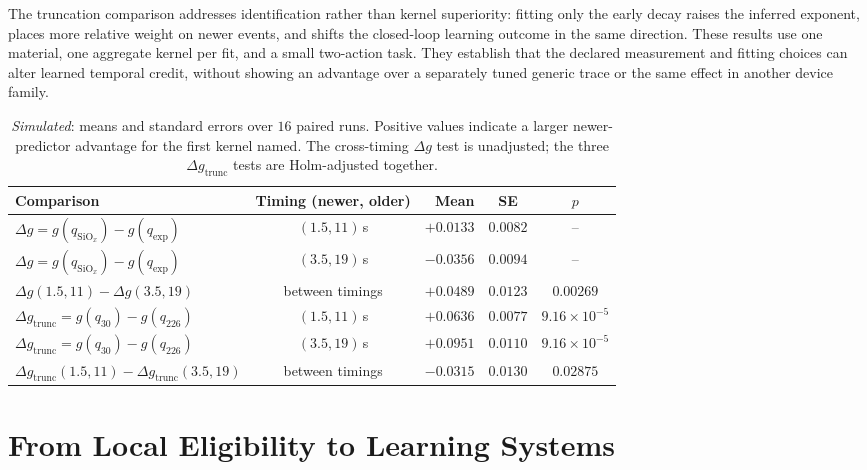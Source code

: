 \noindent The truncation comparison addresses identification rather than kernel superiority: fitting only the early
decay raises the inferred exponent, places more relative weight on newer events, and shifts the closed-loop learning
outcome in the same direction. These results use one material, one aggregate kernel per fit, and a small two-action
task. They establish that the declared measurement and fitting choices can alter learned temporal credit, without
showing an advantage over a separately tuned generic trace or the same effect in another device family.

\begin{table}[H]
    \caption[Learned-credit contrasts at the two evaluation timings.]{\emph{Simulated}: means and standard errors over
    $16$ paired runs. Positive values indicate a larger newer-predictor advantage for the first kernel named. The
    cross-timing $\Delta g$ test is unadjusted; the three $\Delta g_{\mathrm{trunc}}$ tests are Holm-adjusted together.}
    \begin{center}
    \footnotesize
    \setlength{\tabcolsep}{4pt}
    \begin{tabularx}{\textwidth}{@{}>{\raggedright\arraybackslash}X c r c c@{}}
    \toprule
    Comparison & Timing (newer, older) & Mean & SE & $p$ \\
    \midrule
    $\Delta g=g(q_{\mathrm{SiO}_x})-g(q_{\exp})$ & $(1.5,11)$\,s & $+0.0133$ & $0.0082$ & -- \\
    $\Delta g=g(q_{\mathrm{SiO}_x})-g(q_{\exp})$ & $(3.5,19)$\,s & $-0.0356$ & $0.0094$ & -- \\
    $\Delta g(1.5,11)-\Delta g(3.5,19)$ & between timings & $+0.0489$ & $0.0123$ & $0.00269$ \\
    \addlinespace
    $\Delta g_{\mathrm{trunc}}=g(q_{30})-g(q_{226})$ & $(1.5,11)$\,s & $+0.0636$ & $0.0077$ & $9.16\times10^{-5}$ \\
    $\Delta g_{\mathrm{trunc}}=g(q_{30})-g(q_{226})$ & $(3.5,19)$\,s & $+0.0951$ & $0.0110$ & $9.16\times10^{-5}$ \\
    $\Delta g_{\mathrm{trunc}}(1.5,11)-\Delta g_{\mathrm{trunc}}(3.5,19)$ & between timings & $-0.0315$ & $0.0130$ & $0.02875$ \\
    \bottomrule
    \end{tabularx}
    \label{table:7credit}
    \end{center}
\end{table}

\FloatBarrier

\section[From Local Eligibility to Learning Systems]{From Local Eligibility to Learning Systems}
\label{sec:7p3}

